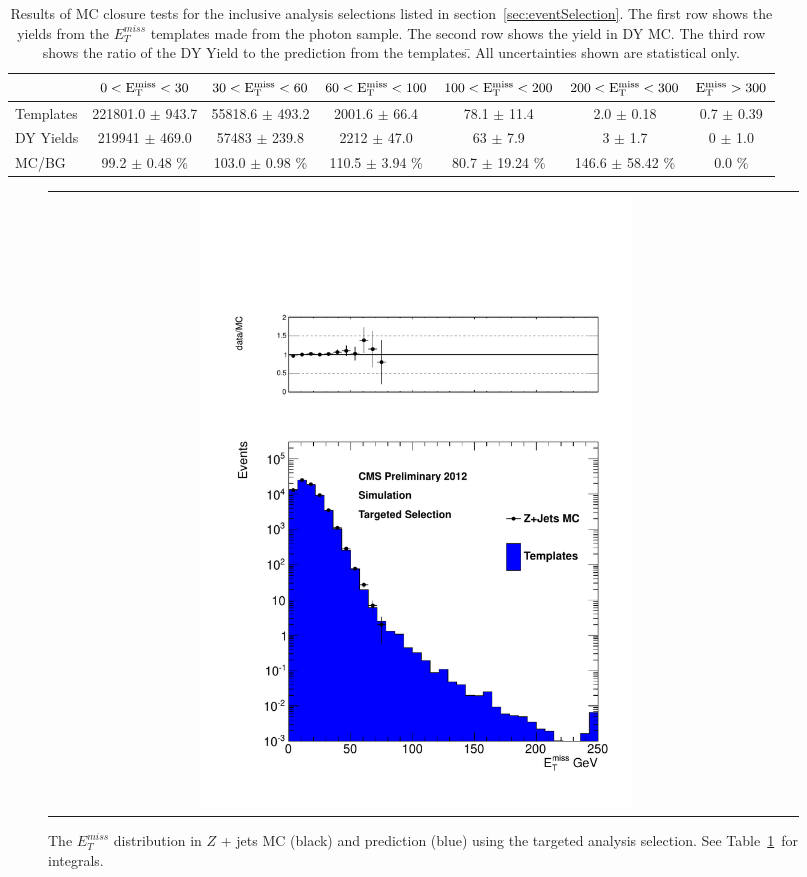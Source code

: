 \begin{table}[htb]
\scriptsize
\begin{center}
\caption{\label{table:inclusive} Results of MC closure tests for the inclusive analysis selections listed in section~\ref{sec:eventSelection}. The first row shows the yields from the $E^{miss}_T$ templates made from the photon sample. The second row shows the yield in DY MC. The third row shows the ratio of the DY Yield to the prediction from the templates.̄ All uncertainties shown are statistical only. }
\begin{tabular}{l|c|c|c|c|c|c}
\hline
\hline
          & $0 < \rm{E_{T}^{miss}} < 30$  & $30 < \rm{E_{T}^{miss}} < 60$  & $60 < \rm{E_{T}^{miss}} < 100$  & $100 < \rm{E_{T}^{miss}} < 200$  & $200 < \rm{E_{T}^{miss}} < 300$  &    $\rm{E_{T}^{miss}} > 300$  \\ 
\hline
Templates & 221801.0 $\pm$ 943.7 & 55818.6 $\pm$ 493.2 & 2001.6 $\pm$ 66.4 & 78.1 $\pm$ 11.4 &   2.0 $\pm$ 0.18 &   0.7 $\pm$ 0.39 \\
DY Yields & 219941 $\pm$ 469.0 & 57483 $\pm$ 239.8 &  2212 $\pm$ 47.0 &     63 $\pm$ 7.9 &      3 $\pm$ 1.7 &      0 $\pm$ 1.0 \\
    MC/BG & 99.2 $\pm$ 0.48 \% & 103.0 $\pm$ 0.98 \% & 110.5 $\pm$ 3.94 \% & 80.7 $\pm$ 19.24 \% & 146.6 $\pm$ 58.42 \% & 0.0 \% \\
\hline
\hline
\end{tabular}
\end{center}
\end{table}

\begin{figure}[!h]
\begin{center}
\begin{tabular}{cc}
\includegraphics[width=0.6\textwidth]{plots/closure_targeted.pdf}
\end{tabular}
\caption{The $E^{miss}_T$ distribution in $Z$ + jets MC (black) and prediction (blue) using the targeted analysis selection. See Table~\ref{table:inclusive}~for integrals.
\label{fig:targetedclosure}
}
\end{center}
\end{figure}

